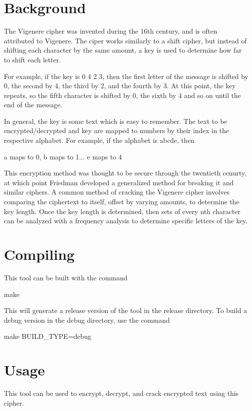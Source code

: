 \hypertarget{vigenere_background_vigenere}{}\section{Background}\label{vigenere_background_vigenere}
The Vigenere cipher was invented during the 16th century, and is often attributed to Vigenere. The ciper works similarly to a shift cipher, but instead of shifting each character by the same amount, a key is used to determine how far to shift each letter.

For example, if the key is \textquotesingle{}0 4 2 3\textquotesingle{}, then the first letter of the message is shifted by 0, the second by 4, the third by 2, and the fourth by 3. At this point, the key repeats, so the fifth character is shifted by 0, the sixth by 4 and so on until the end of the message.

In general, the key is some text which is easy to remember. The text to be encrypted/decrypted and key are mapped to numbers by their index in the respective alphabet. For example, if the alphabet is \textquotesingle{}abcde\textquotesingle{}, then
\begin{DoxyItemize}
\item \textquotesingle{}a\textquotesingle{} maps to 0, \textquotesingle{}b\textquotesingle{} maps to 1... \textquotesingle{}e\textquotesingle{} maps to 4
\end{DoxyItemize}

This encryption method was thought to be secure through the twentieth cenurty, at which point Friedman developed a generalized method for breaking it and similar ciphers. A common method of cracking the Vigenere cipher involves comparing the ciphertext to itself, offset by varying amounts, to determine the key length. Once the key length is determined, then sets of every nth character can be analyzed with a frequency analysis to determine specific letters of the key.\hypertarget{vigenere_compile_vigenere}{}\section{Compiling}\label{vigenere_compile_vigenere}
This tool can be built with the command \begin{DoxyVerb}make
\end{DoxyVerb}
 This will generate a release version of the tool in the release directory. To build a debug version in the debug directory, use the command \begin{DoxyVerb}make BUILD_TYPE=debug
\end{DoxyVerb}
\hypertarget{vigenere_usage_vigenere}{}\section{Usage}\label{vigenere_usage_vigenere}
This tool can be used to encrypt, decrypt, and crack encrypted text using this cipher.

